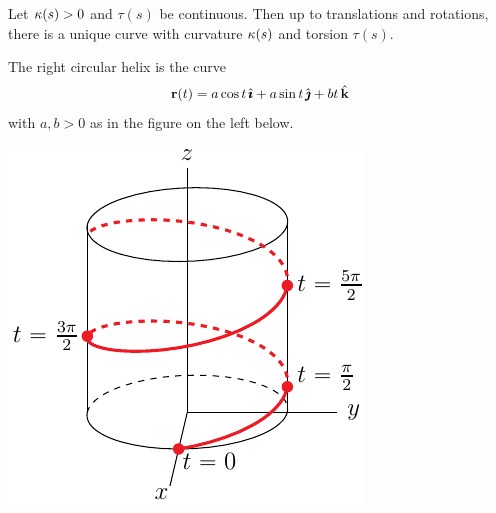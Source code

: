 \begin{theorem}
Let $\kappa(s)>0$ and $\tau(s)$ be continuous. Then up to translations
and rotations, there is a unique curve with curvature $\kappa(s)$ and
torsion $\tau(s)$.
\end{theorem}

\begin{eg}\label{eg:helixTwist}
The right circular helix is the curve
\begin{align*}
\mathbf{r}(t)= a\cos t\,\hat{\pmb{\imath}} +a\sin t\,\hat{\pmb{\jmath}} + bt\,\hat{\mathbf{k}}
\end{align*}
with $a,b>0$ as in the figure on the left below. 
\begin{efig}
\begin{center}
    \includegraphics{helix5.pdf} \qquad

\end{center}
\end{efig}
\end{eg}
